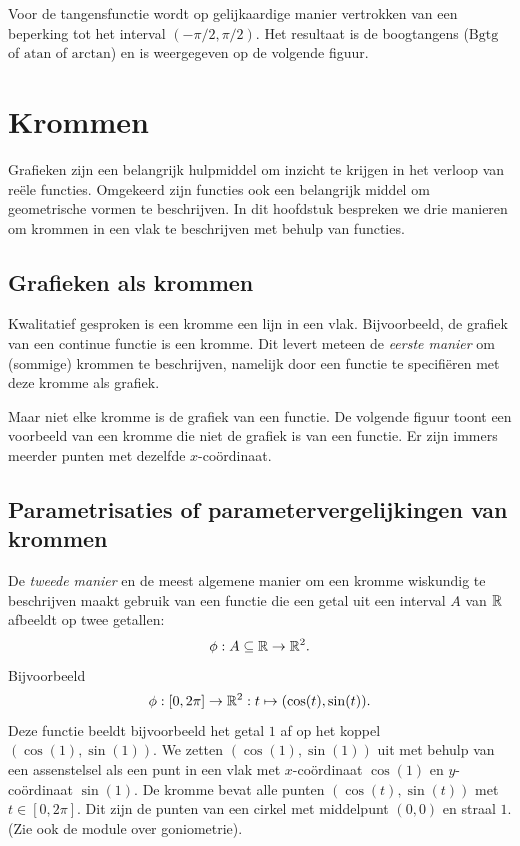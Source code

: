 \newpage


Voor de tangensfunctie wordt op gelijkaardige manier vertrokken van
een beperking tot het interval $(-\pi/2,\pi/2)$. Het resultaat is de
boogtangens ($\mbox{Bgtg}$ of $\mbox{atan}$ of $\mbox{arctan}$) en is
weergegeven op de volgende figuur.


\newpage

\section{Krommen}

\label{seckrom}
Grafieken zijn een belangrijk hulpmiddel om inzicht te krijgen in het
verloop van re\"ele functies. Omgekeerd zijn functies ook een
belangrijk middel om geometrische vormen te beschrijven. In dit
hoofdstuk bespreken we drie manieren om krommen in een vlak te
beschrijven met behulp van functies.

\subsection{Grafieken als krommen}


Kwalitatief gesproken is een kromme een lijn in een
vlak. Bijvoorbeeld, de grafiek van een continue functie is een
kromme. Dit levert meteen de {\em eerste manier} om (sommige) krommen
te beschrijven, namelijk door een functie te specifi\"eren met deze
kromme als grafiek.

Maar niet elke kromme is de grafiek van een functie. De volgende figuur
toont een voorbeeld van een kromme die niet de grafiek is van een
functie. Er zijn immers meerder punten met dezelfde $x$-co\"ordinaat.



\subsection{Parametrisaties of parametervergelijkingen van krommen}

De {\em tweede manier} en de meest algemene manier om een kromme
wiskundig te beschrijven maakt gebruik van een functie die een getal
uit een interval $A$ van $\mathbb{R}$ afbeeldt op twee getallen:
\[
\phi:A\subseteq\mathbb{R}\rightarrow\mathbb{R}^2.
\]
Bijvoorbeeld
\[
\phi: [0,2\pi] \rightarrow \mathbb{R}^2: t \mapsto (\cos(t),\sin(t)).
\]
Deze functie beeldt bijvoorbeeld het getal $1$ af op het koppel
$(\cos(1),\sin(1))$. We zetten $(\cos(1),\sin(1))$ uit met behulp van een
assenstelsel als een punt in een vlak met $x$-co\"ordinaat $\cos(1)$ en
$y$-co\"ordinaat $\sin(1)$. De kromme bevat alle punten
$(\cos(t),\sin(t))$ met $t\in[0,2\pi]$. Dit zijn de punten van een cirkel
met middelpunt $(0,0)$ en straal $1$. (Zie ook de module over goniometrie).

